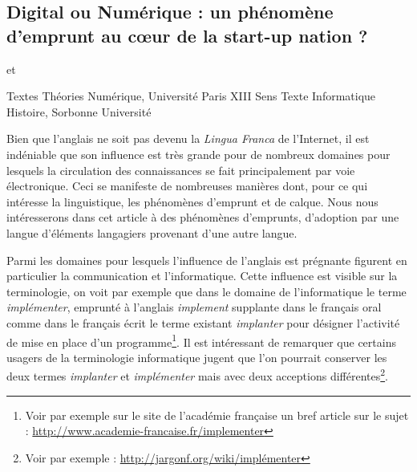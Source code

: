 \begin{center}
\section*{Digital ou Numérique : un phénomène d'emprunt au c\oe ur de la start-up nation ?} 
  et
 

{\small {} Textes Théories Numérique, Université Paris XIII}
{\small {} Sens Texte Informatique Histoire, Sorbonne Université}

\end{center}


 Bien que l'anglais ne soit pas devenu la \textit{Lingua Franca} de l'Internet,  il est indéniable que son influence est très grande pour de nombreux domaines pour lesquels la circulation des connaissances se fait principalement par voie électronique\cite{Crystal-2002}. 
  Ceci se manifeste de nombreuses manières dont, pour ce qui intéresse la linguistique, les phénomènes d'emprunt et de calque.
   Nous nous intéresserons dans cet article à des phénomènes d'emprunts, d'adoption par une langue d'éléments langagiers provenant d'une autre langue. 
  
 Parmi les domaines pour lesquels l'influence de l'anglais est prégnante figurent en particulier la communication et l'informatique.
 Cette influence est visible sur la terminologie, on voit par exemple que dans le domaine de l'informatique le terme \textit{implémenter}, emprunté à l'anglais \textit{implement} supplante dans le français oral comme dans le français écrit le terme existant \textit{implanter} pour désigner l'activité de mise en place d'un programme\footnote{Voir par exemple sur le site de l'académie française un bref article sur le sujet : \url{http://www.academie-francaise.fr/implementer}}.
 Il est intéressant de remarquer que certains usagers de la terminologie informatique jugent que l'on pourrait conserver les deux termes \textit{implanter} et \textit{implémenter} mais avec deux acceptions différentes\footnote{Voir par exemple : \url{http://jargonf.org/wiki/implémenter}}.
  
